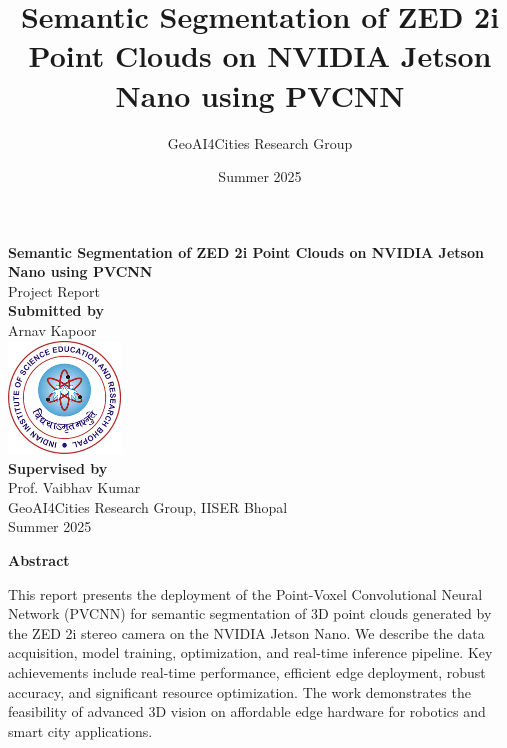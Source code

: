 \documentclass[12pt,a4paper]{report}
\title{Semantic Segmentation of ZED 2i Point Clouds on NVIDIA Jetson Nano using PVCNN}
\author{GeoAI4Cities Research Group}
\date{Summer 2025}
\begin{document}
\begin{titlepage}
    \centering
    \vspace*{1cm}
    {\LARGE\bfseries Semantic Segmentation of ZED 2i Point Clouds on NVIDIA Jetson Nano using PVCNN}\\[0.5cm]
    {\Large Project Report}\\[2cm]
    {\large \textbf{Submitted by}}\\[0.5cm]
    {\Large Arnav Kapoor}\\[1.5cm]
    \includegraphics[width=3cm]{logo.png}\\[1.5cm]
    {\large \textbf{Supervised by}}\\[0.5cm]
    {\Large Prof. Vaibhav Kumar}\\[2cm]
    {\large GeoAI4Cities Research Group, IISER Bhopal}\\[0.5cm]
    {\large Summer 2025}
\end{titlepage}

\newpage
\begin{center}
    {\LARGE\textbf{Abstract}}\\[1.5em]
    \begin{minipage}{0.9\textwidth}
    \small
    This report presents the deployment of the Point-Voxel Convolutional Neural Network (PVCNN) for semantic segmentation of 3D point clouds generated by the ZED 2i stereo camera on the NVIDIA Jetson Nano. We describe the data acquisition, model training, optimization, and real-time inference pipeline. Key achievements include real-time performance, efficient edge deployment, robust accuracy, and significant resource optimization. The work demonstrates the feasibility of advanced 3D vision on affordable edge hardware for robotics and smart city applications.
    \end{minipage}
\end{center}

\newpage
{}
\tableofcontents
\newpage
\listoffigures
{}
\newpage
\listoftables
{}
\newpage
\end{document}
